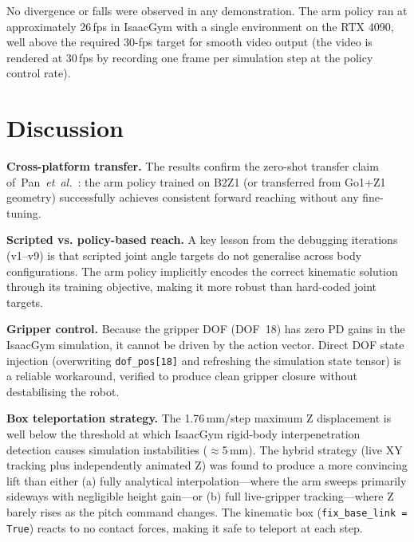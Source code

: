 No divergence or falls were observed in any demonstration.
The arm policy ran at approximately 26\,fps in IsaacGym with a single
environment on the RTX 4090, well above the required 30-fps target for
smooth video output (the video is rendered at 30\,fps by recording one
frame per simulation step at the policy control rate).

\section{Discussion}

\textbf{Cross-platform transfer.}  The results confirm the zero-shot
transfer claim of~Pan~\emph{et~al.}~\cite{pan2024roboduet}: the arm policy trained on
B2Z1 (or transferred from Go1+Z1 geometry) successfully achieves
consistent forward reaching without any fine-tuning.

\textbf{Scripted vs. policy-based reach.}  A key lesson from the debugging
iterations (v1--v9) is that scripted joint angle targets do not generalise
across body configurations.  The arm policy implicitly encodes the correct
kinematic solution through its training objective, making it more robust
than hard-coded joint targets.

\textbf{Gripper control.}  Because the gripper DOF (DOF~18) has zero PD
gains in the IsaacGym simulation, it cannot be driven by the action vector.
Direct DOF state injection (overwriting \texttt{dof\_pos[18]} and
refreshing the simulation state tensor) is a reliable workaround, verified
to produce clean gripper closure without destabilising the robot.

\textbf{Box teleportation strategy.}  The 1.76\,mm/step maximum Z
displacement is well below the threshold at which IsaacGym rigid-body
interpenetration detection causes simulation instabilities ($\approx$5\,mm).
The hybrid strategy (live XY tracking plus independently animated Z) was
found to produce a more convincing lift than either (a) fully analytical
interpolation---where the arm sweeps primarily sideways with negligible
height gain---or (b) full live-gripper tracking---where Z barely rises
as the pitch command changes.
The kinematic box (\texttt{fix\_base\_link = True}) reacts to no contact
forces, making it safe to teleport at each step.
